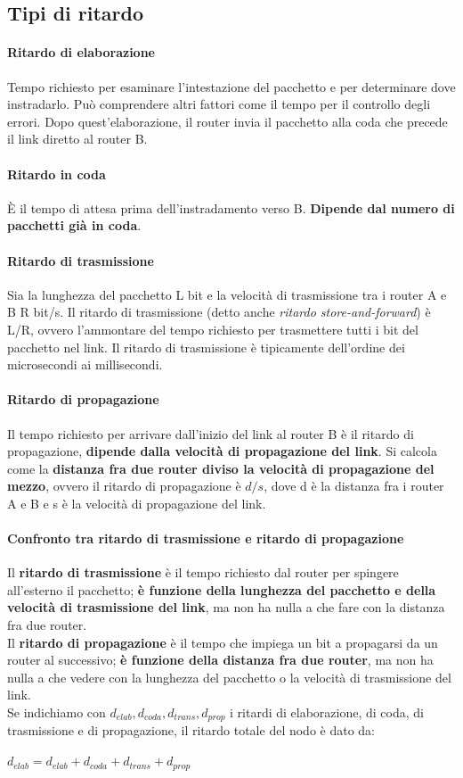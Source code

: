 \documentclass[11pt,a4paper]{book}
\begin{document}
\subsection{Tipi di ritardo} \label{par: ritardi}
\paragraph{Ritardo di elaborazione}
Tempo richiesto per esaminare l’intestazione del pacchetto e per determinare dove instradarlo.
Può comprendere altri fattori come il tempo per il controllo degli errori.
Dopo quest’elaborazione, il router invia il pacchetto alla coda che precede il link diretto al router B.
\paragraph{Ritardo in coda}
È il tempo di attesa prima dell’instradamento verso B. \textbf{Dipende dal numero di pacchetti già in coda}.
\paragraph{Ritardo di trasmissione}
Sia la lunghezza del pacchetto L bit e la velocità di trasmissione tra i router A e B R bit/s. Il ritardo di trasmissione (detto anche \emph{ritardo store-and-forward}) è L/R, ovvero l'ammontare del tempo richiesto per trasmettere tutti i bit del pacchetto nel link.
Il ritardo di trasmissione è tipicamente dell'ordine dei microsecondi ai millisecondi.
\paragraph{Ritardo di propagazione} 
Il tempo richiesto per arrivare dall'inizio del link al router B è il ritardo di propagazione, \textbf{dipende dalla velocità di propagazione del link}.
Si calcola come la \textbf{distanza fra due router diviso la velocità di propagazione del mezzo}, ovvero il ritardo di propagazione è $d/s$, dove d è la distanza fra i router A e B e s è la velocità di propagazione del link.
\paragraph{Confronto tra ritardo di trasmissione e ritardo di propagazione}
Il \textbf{ritardo di trasmissione} è il tempo richiesto dal router per spingere all'esterno il pacchetto; \textbf{è funzione della lunghezza del pacchetto e della velocità di trasmissione del link}, ma non ha nulla a che fare con la distanza fra due router.\\
Il \textbf{ritardo di propagazione} è il tempo che impiega un bit a propagarsi da un router al successivo; \textbf{è funzione della distanza fra due router}, ma non ha nulla a che vedere con la lunghezza del pacchetto o la velocità di trasmissione del link. \\
Se indichiamo con $d_{elab}, d_{coda}, d_{trans}, d_{prop}$ i ritardi di elaborazione, di coda, di trasmissione e di propagazione, il ritardo totale del nodo è dato da:
\begin{center}
	$d_{elab} = d_{elab} + d_{coda} + d_{trans} + d_{prop}$
\end{center}
\end{document}
